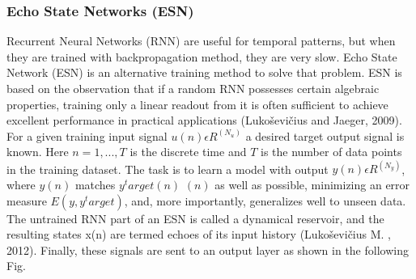 \documentclass[review]{elsarticle}
\begin{document}
\subsubsection{Echo State Networks (ESN)}
Recurrent Neural Networks (RNN) are useful for temporal patterns, but when they are trained with backpropagation method, they are very slow.  Echo State Network (ESN) is an alternative training method to solve that problem.  ESN is based on the observation that if a random RNN possesses certain algebraic properties, training only a linear readout from it is often sufficient to achieve excellent performance in practical applications (Lukoševičius and Jaeger, 2009). 
For a given training input signal $u(n)  ϵ R^(N_u )$ a desired target output signal 
is known. Here $n = 1, . . . ,T$ is the discrete time and $T$ is the number of data points in the training dataset. The task is to learn a model with output $y(n)  ϵ R^(N_y )$, where $y(n)$ matches $y^target(n)$ $(n)$ as well as possible, minimizing an error measure $E(y,y^target)$, and, more importantly, generalizes well to unseen data. The untrained RNN part of an ESN is called a dynamical reservoir, and the resulting states x(n) are termed echoes of its input history
 (Lukoševičius M. , 2012). Finally, these signals are sent to an output layer as shown in the following Fig.
 
\end{document}
